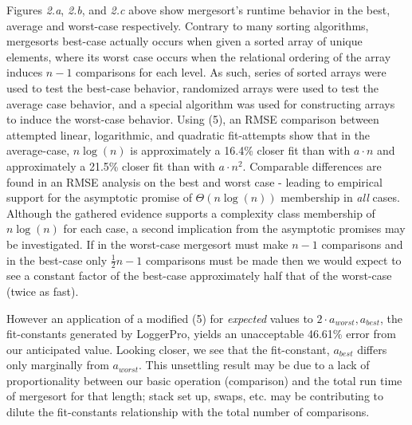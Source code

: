 \documentclass[11pt,letterpaper]{report}
\begin{document}
Figures \emph{2.a}, \emph{2.b}, and \emph{2.c} above show mergesort's runtime behavior in the best, average and worst-case respectively. Contrary to many sorting algorithms, mergesorts best-case actually occurs when given a sorted array of unique elements, where its worst case occurs when the relational ordering of the array induces $n-1$ comparisons for each level. As such, series of sorted arrays were used to test the best-case behavior, randomized arrays were used to test the average case behavior, and a special algorithm was used for constructing arrays to induce the worst-case behavior.
Using (5), an RMSE comparison between attempted linear, logarithmic, and quadratic fit-attempts show that in the average-case, $n\log{}(n)$ is approximately a 16.4\% closer fit than with $a \cdot n$ and approximately a 21.5\% closer fit than with $a \cdot n^2$. Comparable differences are found in an RMSE analysis on the best and worst case - leading to empirical support for the asymptotic promise of $\Theta(n\log{}(n))$ membership in \emph{all} cases.
Although the gathered evidence supports a complexity class membership of $n \log{}(n)$ for each case, a second implication from the asymptotic promises may be investigated. If in the worst-case mergesort must make $n-1$ comparisons and in the best-case only $\frac{1}{2}n-1$ comparisons must be made then we would expect to see a constant factor of the best-case approximately half that of the worst-case (twice as fast). 

However an application of a modified (5) for \emph{expected} values to $2 \cdot a_{worst}, a_{best}$, the fit-constants generated by LoggerPro, yields an unacceptable 46.61\% error from our anticipated value. Looking closer, we see that the fit-constant, $a_{best}$ differs only marginally from $a_{worst}$. This unsettling result may be due to a lack of proportionality between our basic operation (comparison) and the total run time of mergesort for that length; stack set up, swaps, etc. may be contributing to dilute the fit-constants relationship with the total number of comparisons.
\end{document}
